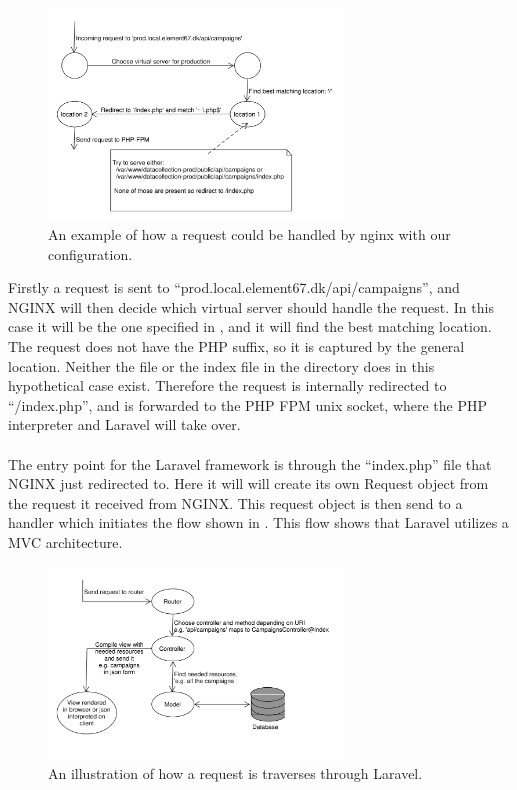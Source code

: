 \begin{figure}[!htbp]
    \centering
    \includegraphics[width=0.7\textwidth]{graphic/architecture/nginx_workflow.pdf}
    \caption{An example of how a request could be handled by nginx with our configuration.}
    \label{fig:nginx_workflow}
\end{figure}
\FloatBarrier

Firstly a request is sent to ``prod.local.element67.dk/api/campaigns'', and NGINX will then decide which virtual server should handle the request. In this case it will be the one specified in , and it will find the best matching location. The request does not have the PHP suffix, so it is captured by the general location. Neither the file or the index file in the directory does in this hypothetical case exist. Therefore the request is internally redirected to ``/index.php'', and is forwarded to the PHP FPM unix socket, where the PHP interpreter and Laravel will take over. 
\\\\
The entry point for the Laravel framework is through the ``index.php'' file that NGINX just redirected to. Here it will will create its own Request object from the request it received from NGINX. This request object is then send to a handler which initiates the flow shown in . This flow shows that Laravel utilizes a MVC architecture.

\begin{figure}[!htbp]
    \centering
    \includegraphics[width=0.7\textwidth]{graphic/architecture/laravel_flow.pdf}
    \caption{An illustration of how a request is traverses through Laravel.}
    \label{fig:laravel_flow}
\end{figure}

